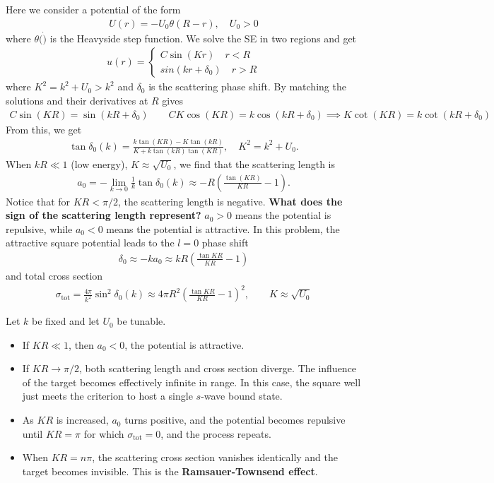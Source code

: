 \documentclass{book}
\theoremstyle{definition}
\newcommand{\f}[2]{\frac{#1}{#2}}
\newcommand{\lp}{\left(}
\newcommand{\rp}{\right)}
\begin{document}
Here we consider a potential of the form
\begin{align*}
	U(r) = -U_0 \theta(R-r), \quad U_0 > 0
\end{align*}
where $\theta(\dot)$ is the Heavyside step function. We solve the SE in two regions and get 
\begin{align*}
	u(r) = \begin{cases}
		C\sin(Kr) \quad r < R \\
		sin(kr + \delta_0) \quad r > R
	\end{cases}
\end{align*}
where $K^2 = k^2 + U_0 > k^2$ and $\delta_0$ is the scattering phase shift. By matching the solutions and their derivatives at $R$ gives
\begin{align*}
	C\sin(KR) = \sin(kR + \delta_0) \quad\quad CK\cos(KR) = k\cos(kR + \delta_0) \implies K\cot(KR) = k\cot(kR+ \delta_0)
\end{align*}
From this, we get
\begin{align*}
	\tan \delta_0 (k)= \f{k\tan(KR) - K\tan(kR)}{K + k\tan(kR)\tan(KR)}, \quad K^2 = k^2 + U_0.
\end{align*}
When $kR \ll 1$ (low energy), $K \approx \sqrt{U_0}$, we find that the scattering length is 
\begin{align*}
	a_0 = -\lim_{k\to 0} \f{1}{k}\tan \delta_0(k) \approx -R \lp \f{\tan(KR)}{KR} - 1 \rp.
\end{align*}
Notice that for $KR < \pi/2$, the scattering length is negative. \textbf{What does the sign of the scattering length represent?} $a_0 > 0$ means the potential is repulsive, while $a_0 < 0$ means the potential is attractive. In this problem, the attractive square potential leads to the $l=0$ phase shift
\begin{align*}
	\delta_0 \approx -ka_0 \approx kR \lp \f{\tan KR}{KR} - 1 \rp
\end{align*}
and total cross section
\begin{align*}
	\sigma_\text{tot} = \f{4\pi}{k^2}\sin^2 \delta_0(k) \approx 4\pi R^2 \lp \f{\tan KR}{KR} - 1 \rp^2, \quad \quad K \approx \sqrt{U_0}
\end{align*}

Let $k$ be fixed and let $U_0$ be tunable. 
\begin{itemize}
	\item If $KR \ll 1$, then $a_0 < 0$, the potential is attractive.
	
	\item If $KR \to \pi/2$, both scattering length and cross section diverge. The influence of the target becomes effectively infinite in range. In this case, the square well just meets the criterion to host a single $s$-wave bound state. 
	
	\item As $KR$ is increased, $a_0$ turns positive, and the potential becomes repulsive until $KR = \pi$ for which $\sigma_\text{tot} = 0$, and the process repeats. 
	
	\item When $KR = n\pi$, the scattering cross section vanishes identically and the target becomes invisible. This is the \textbf{Ramsauer-Townsend effect}.
\end{itemize}
\end{document}
